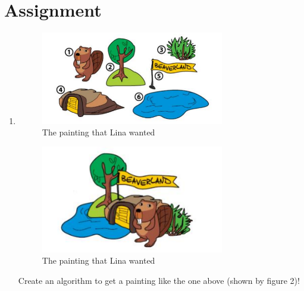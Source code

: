 \documentclass[12pt,titlepage]{article}
\begin{document}
\pagebreak

\section{Assignment}

\begin{enumerate}
    \item {
        \begin{figure}[h]
            \centering
            \includegraphics[width=8cm]{images/figure6.png}
            \caption{The painting that Lina wanted}
            \label{fig:stamps}
        \end{figure}
        \begin{figure}[h]
            \centering
            \includegraphics[width=8cm]{images/figure7.png}
            \caption{The painting that Lina wanted}
            \label{fig:painting}
        \end{figure}
        Create an algorithm to get a painting like the one above (shown by figure 2)!

}
\end{enumerate}
\end{document}
